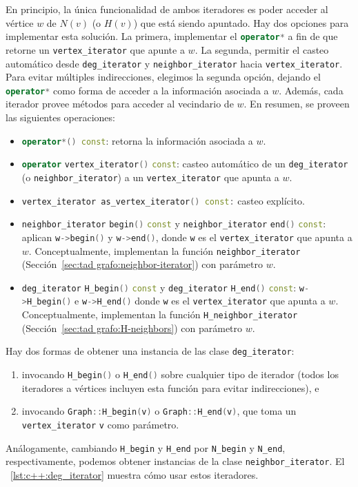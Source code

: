 \documentclass[%
    a4paper,%
    fontsize=12pt,%
    DIV=12,
    twoside,%
    openright,%
    titlepage=true,%
    headsepline,%
    toc=bibliography,%
    parskip=half,%
    cleardoublepage=empty,%
    headings=big,%
]{scrbook}
\makeatletter
\newcommand{\Code}[2][]{\lstinline[basicstyle={\ttfamily},#1]@#2@}
\newcommand{\CPPCode}[2][]{\lstinline[language=C++,basicstyle={\ttfamily},#1]@#2@}
\makeatother
\begin{document}
En principio, la única funcionalidad de ambos iteradores es poder acceder al vértice $w$ de $N(v)$ (o $H(v)$) que está siendo apuntado.  Hay dos opciones para implementar esta solución.  La primera, implementar el \CPPCode{operator*} a fin de que retorne un \CPPCode{vertex_iterator} que apunte a $w$.  La segunda, permitir el casteo automático desde \CPPCode{deg_iterator} y \CPPCode{neighbor_iterator} hacia \CPPCode{vertex_iterator}.  Para evitar múltiples indirecciones, elegimos la segunda opción, dejando el \CPPCode{operator*} como forma de acceder a la información asociada a $w$.  Además, cada iterador provee métodos para acceder al vecindario de $w$.  En resumen, se proveen las siguientes operaciones:
\begin{itemize}
  \item \CPPCode{operator*() const}: retorna la información asociada a $w$.
  \item \CPPCode{operator} \CPPCode{vertex_iterator()} \CPPCode{const}: casteo automático de un \CPPCode{deg_iterator} (o \CPPCode{neighbor_iterator}) a un \CPPCode{vertex_iterator} que apunta a $w$.
  \item \CPPCode{vertex_iterator as_vertex_iterator() const:} casteo explícito.
  \item \CPPCode{neighbor_iterator} \CPPCode{begin()} \CPPCode{const} y \CPPCode{neighbor_iterator} \CPPCode{end()} \CPPCode{const}: aplican \CPPCode{w->begin()} y \CPPCode{w->end()}, donde \CPPCode{w} es el \CPPCode{vertex_iterator} que apunta a $w$.   Conceptualmente, implementan la función \Code{neighbor_iterator} (Sección~\ref{sec:tad grafo:neighbor-iterator}) con parámetro $w$.
  \item \CPPCode{deg_iterator} \CPPCode{H_begin()} \CPPCode{const} y \CPPCode{deg_iterator} \CPPCode{H_end()} \CPPCode{const}:  \CPPCode{w->H_begin()} e \CPPCode{w->H_end()} donde \CPPCode{w} es el \CPPCode{vertex_iterator} que apunta a $w$. Conceptualmente, implementan la función \Code{H_neighbor_iterator} (Sección~\ref{sec:tad grafo:H-neighbors}) con parámetro $w$.  
\end{itemize}

Hay dos formas de obtener una instancia de las clase \CPPCode{deg_iterator}: 
\begin{enumerate}[1.]
  \item invocando \CPPCode{H_begin()} o \CPPCode{H_end()} sobre cualquier tipo de iterador (todos los iteradores a vértices incluyen esta función para evitar indirecciones), e 
  \item invocando \CPPCode{Graph::H_begin(v)} o \CPPCode{Graph::H_end(v)}, que toma un \CPPCode{vertex_iterator} \CPPCode{v} como parámetro.
\end{enumerate}
Análogamente, cambiando \CPPCode{H_begin} y \CPPCode{H_end} por \CPPCode{N_begin} y \CPPCode{N_end}, respectivamente, podemos obtener instancias de la clase \CPPCode{neighbor_iterator}.  El \lstlistingname~\ref{lst:c++:deg_iterator} muestra cómo usar estos iteradores.
\end{document}
